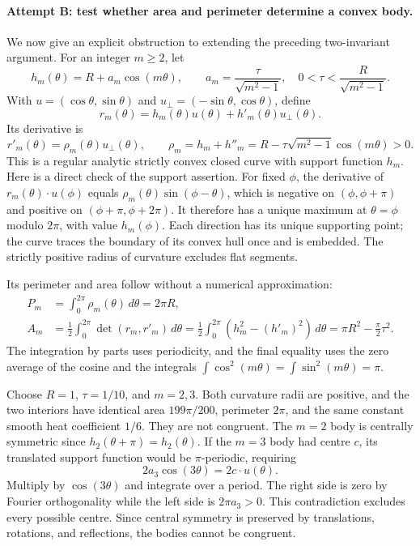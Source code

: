 \documentclass[11pt]{article}
\begin{document}
\paragraph{Attempt B: test whether area and perimeter determine a convex body.}
We now give an explicit obstruction to extending the preceding two-invariant
argument. For an integer $m\ge2$, let
\begin{equation}\label{a492:support}
 h_m(\theta)=R+a_m\cos(m\theta),\qquad
 a_m=\frac{\tau}{\sqrt{m^2-1}},
 \quad 0<\tau<\frac{R}{\sqrt{m^2-1}}.
\end{equation}
With $u=(\cos\theta,\sin\theta)$ and
$u_\perp=(-\sin\theta,\cos\theta)$, define
\[
 r_m(\theta)=h_m(\theta)u(\theta)+h'_m(\theta)u_\perp(\theta).
\]
Its derivative is
\[
 r'_m(\theta)=\rho_m(\theta)u_\perp(\theta),\qquad
 \rho_m=h_m+h''_m=R-\tau\sqrt{m^2-1}\cos(m\theta)>0.
\]
This is a regular analytic strictly convex closed curve with support
function $h_m$. Here is a direct check of the support assertion. For fixed
$\phi$, the derivative of $r_m(\theta)\cdot u(\phi)$ equals
$\rho_m(\theta)\sin(\phi-\theta)$, which is negative on
$(\phi,\phi+\pi)$ and positive on $(\phi+\pi,\phi+2\pi)$.
It therefore has a unique maximum at $\theta=\phi$ modulo $2\pi$,
with value $h_m(\phi)$. Each direction has its unique supporting point;
the curve traces the boundary of its convex hull once and is embedded.
The strictly positive radius of curvature excludes flat segments.

Its perimeter and area follow without a numerical approximation:
\begin{align}
 P_m&=\int_0^{2\pi}\rho_m(\theta)\,d\theta=2\pi R,
                                                       \label{a492:perimeter}\\
 A_m&=\frac12\int_0^{2\pi}\det(r_m,r'_m)\,d\theta
      =\frac12\int_0^{2\pi}(h_m^2-(h'_m)^2)\,d\theta
      =\pi R^2-\frac\pi2\tau^2.                        \label{a492:area}
\end{align}
The integration by parts uses periodicity, and the final equality uses
the zero average of the cosine and the integrals $\int\cos^2(m\theta)
=\int\sin^2(m\theta)=\pi$.

Choose $R=1$, $\tau=1/10$, and $m=2,3$. Both curvature radii are
positive, and the two interiors have identical area $199\pi/200$,
perimeter $2\pi$, and the same constant smooth heat coefficient $1/6$.
They are not congruent. The $m=2$ body is centrally symmetric since
$h_2(\theta+\pi)=h_2(\theta)$. If the $m=3$ body had centre $c$,
its translated support function would be $\pi$-periodic, requiring
\[
       2a_3\cos(3\theta)=2c\cdot u(\theta).
\]
Multiply by $\cos(3\theta)$ and integrate over a period. The right side
is zero by Fourier orthogonality while the left side is $2\pi a_3>0$.
This contradiction excludes every possible centre. Since central symmetry
is preserved by translations, rotations, and reflections, the bodies cannot
be congruent.
\end{document}
